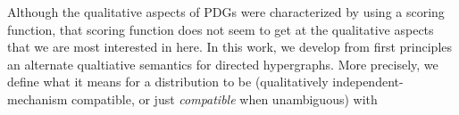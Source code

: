 Although the qualitative aspects of PDGs were characterized  
by
\citeauthor{pdg-aaai} \cite{pdg-aaai}
using a scoring function, that scoring function does not seem to get at the qualitative aspects that we are most interested in here.
In this work, we develop from first principles an alternate qualtiative semantics for directed hypergraphs.
More precisely, we define what it means for a distribution to be 
\emph{\scible} (qualitatively independent-mechanism compatible, or just \emph{compatible} when unambiguous) with

